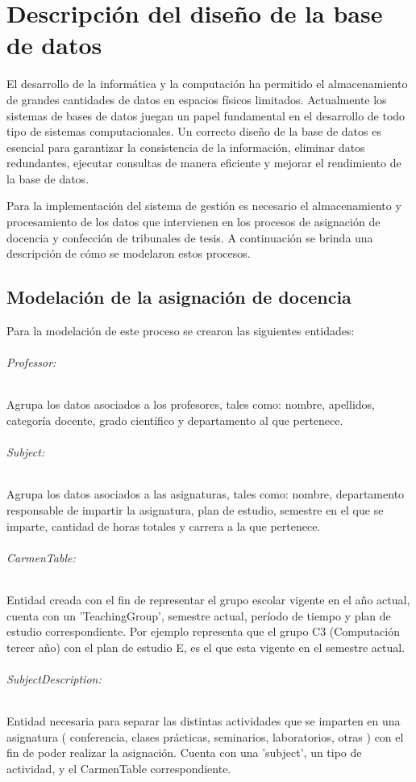 \chapter{Descripción del diseño de la base de datos}\label{chapter:database}
El desarrollo de la informática y la computación ha permitido
el almacenamiento de grandes cantidades de datos en espacios 
físicos limitados. Actualmente los sistemas de bases de datos juegan
un papel fundamental en el desarrollo de todo tipo de sistemas computacionales.
Un correcto diseño de la base de datos es esencial para garantizar 
la consistencia de la información, eliminar datos redundantes,
ejecutar consultas de manera eficiente y mejorar el 
rendimiento de la base de datos.

Para la implementación del sistema de gestión es necesario el almacenamiento
y procesamiento de los datos que intervienen en los procesos de asignación de 
docencia y confección de tribunales de tesis. A continuación se brinda una 
descripción de cómo se modelaron estos procesos.



\section{Modelación de la asignación de docencia}
Para la modelación de este proceso se crearon las 
siguientes entidades:

\subparagraph{Professor:}
Agrupa los datos asociados a los profesores, 
tales como: nombre, apellidos, categoría docente, grado 
científico y departamento al que pertenece.

\subparagraph{Subject:}
Agrupa los datos asociados a las asignaturas,
tales como: nombre, departamento responsable de impartir
la asignatura, plan de estudio, semestre en el que se 
imparte, cantidad de horas totales y carrera a la que 
pertenece.

\subparagraph{CarmenTable:}
Entidad creada con el fin de representar
el grupo escolar vigente en el año actual, cuenta con un
'TeachingGroup', semestre actual, período de tiempo y 
plan de estudio correspondiente. Por ejemplo representa 
que el grupo C3 (Computación tercer año) con el plan de 
estudio E, es el que esta vigente en el semestre actual.

\subparagraph{SubjectDescription:}
Entidad necesaria para separar las distintas actividades 
que se imparten en una asignatura ( conferencia, clases 
prácticas, seminarios, laboratorios, otras ) con el fin 
de poder realizar la asignación. Cuenta con una 'subject',
un tipo de actividad, y el CarmenTable correspondiente.



